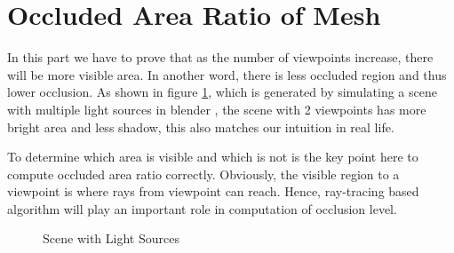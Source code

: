 \documentclass[11pt, a4paper,oneside,chapterprefix=false]{scrbook}
\begin{document}
\section{Occluded Area Ratio of Mesh} \label{sec:occluded area ratio of mesh}

In this part we have to prove that as the number of viewpoints increase, there will be more visible area. In another word, there is less occluded region and thus lower occlusion. As shown in figure \ref{fig:scene with light sources}, which is generated by simulating a scene with multiple light sources in blender \cite{blender2023}, the scene with 2 viewpoints has more bright area and less shadow, this also matches our intuition in real life. 

\vspace{10pt}

To determine which area is visible and which is not is the key point here to compute occluded area ratio correctly. Obviously, the visible region to a viewpoint is where rays from viewpoint can reach. Hence, ray-tracing based algorithm will play an important role in computation of occlusion level.  

\begin{figure}[H]
    \centering
     \hfill
    \caption{Scene with Light Sources}
    \label{fig:scene with light sources}
\end{figure}
\end{document}
